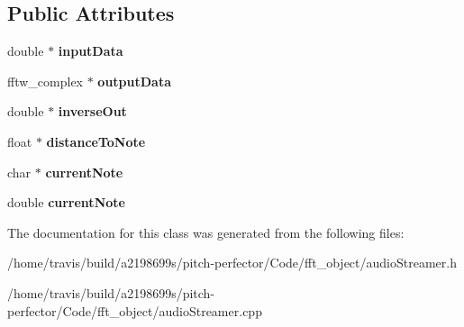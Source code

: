 \subsection*{Public Attributes}
\begin{DoxyCompactItemize}
\item 
\hypertarget{classaudioStreamer_a392bb08783c92e356e704f40ff6a109a}{double $\ast$ {\bfseries input\-Data}}\label{classaudioStreamer_a392bb08783c92e356e704f40ff6a109a}

\item 
\hypertarget{classaudioStreamer_ab44575639696ec28e58a0ca4d5e7d099}{fftw\-\_\-complex $\ast$ {\bfseries output\-Data}}\label{classaudioStreamer_ab44575639696ec28e58a0ca4d5e7d099}

\item 
\hypertarget{classaudioStreamer_a1d8289cf32dd73375172f06c998d7a9f}{double $\ast$ {\bfseries inverse\-Out}}\label{classaudioStreamer_a1d8289cf32dd73375172f06c998d7a9f}

\item 
\hypertarget{classaudioStreamer_a02267d0dc3b957a812327cd56299c459}{float $\ast$ {\bfseries distance\-To\-Note}}\label{classaudioStreamer_a02267d0dc3b957a812327cd56299c459}

\item 
\hypertarget{classaudioStreamer_a943371f31102ab0f493addfbd685f210}{char $\ast$ {\bfseries current\-Note}}\label{classaudioStreamer_a943371f31102ab0f493addfbd685f210}

\item 
\hypertarget{classaudioStreamer_a721e16ff965429808516f39e93c50b82}{double {\bfseries current\-Note}}\label{classaudioStreamer_a721e16ff965429808516f39e93c50b82}

\end{DoxyCompactItemize}


The documentation for this class was generated from the following files\-:\begin{DoxyCompactItemize}
\item 
/home/travis/build/a2198699s/pitch-\/perfector/\-Code/fft\-\_\-object/audio\-Streamer.\-h\item 
/home/travis/build/a2198699s/pitch-\/perfector/\-Code/fft\-\_\-object/audio\-Streamer.\-cpp\end{DoxyCompactItemize}
